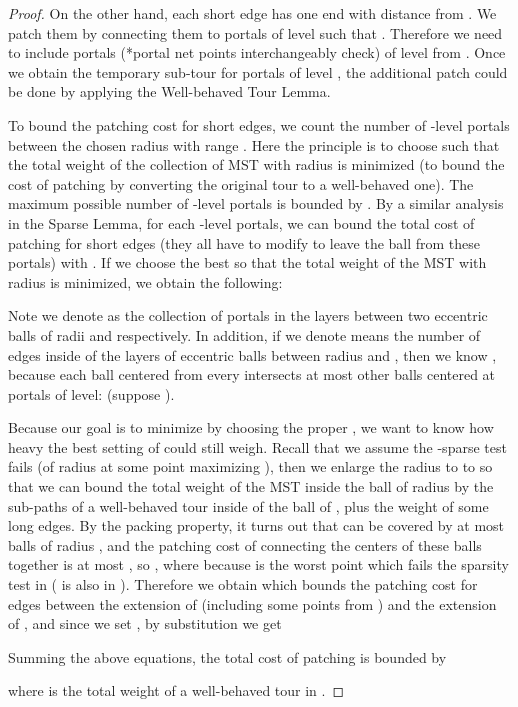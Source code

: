 \documentclass{llncs}
\begin{document}
\begin{proof}
On the other hand, each short edge has one end with distance  from .
We patch them by connecting them to portals of level  such that .
Therefore we need to include portals (*portal net points interchangeably check) of level  from .
Once we obtain the temporary sub-tour for portals of level , the additional patch could be done by applying the Well-behaved Tour Lemma.

To bound the patching cost for short edges, we count the number of -level portals between the chosen radius with range .
Here the principle is to choose  such that the total weight of the collection of MST with radius  is minimized (to bound the cost of patching by converting the original tour to a well-behaved one).
The maximum possible number of -level portals is bounded by .
By a similar analysis in the Sparse Lemma, for each -level portals, we can bound the total cost of patching for short edges (they all have to modify to leave the ball from these portals) with .
If we choose the best  so that the total weight of the MST with radius  is minimized, we obtain
the following: 

Note we denote  as the collection of  portals in the layers between two eccentric balls of radii  and  respectively. 
In addition, if we denote  means the number of edges inside of the layers of eccentric balls between radius  and , then we know , because each ball  centered from every  intersects at most  other balls centered at portals of  level:  (suppose ).

Because our goal is to minimize  by choosing the proper , we want to know how heavy the best setting of  could still weigh.
Recall that we assume the -sparse test fails (of radius  at some point maximizing ), then we enlarge the radius to  to so that we can bound the total weight of the MST inside the ball of radius  by the sub-paths of a well-behaved tour inside of the ball of , plus the weight of some long edges.
By the packing property, it turns out that  can be covered by at most  balls of radius , and the patching cost of connecting the centers of these balls together is at most , so , where  because  is the worst point which fails the sparsity test in ( is also in ).
Therefore we obtain  which bounds the patching cost for edges between the extension of  (including some points from ) and the extension of , and since we set , by substitution we get

Summing the above equations, the total cost of patching is bounded by 

where  is the total weight of a well-behaved tour in .


\end{proof}
\end{document}
